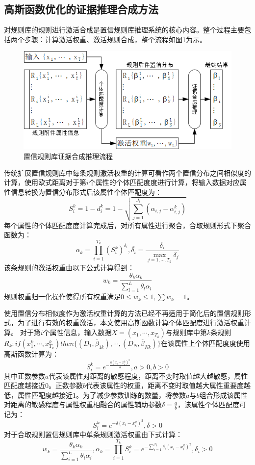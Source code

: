 \documentclass{cjc}
\begin{document}
\subsection{高斯函数优化的证据推理合成方法}
对规则库的规则进行激活合成是置信规则库推理系统的核心内容。整个过程主要包括两个步骤：计算激活权重、激活规则合成，整个流程如图1为示。
\begin{figure}
	\includegraphics[width=\linewidth]{1brb.png}
	\caption{置信规则库证据合成推理流程}
\end{figure}

传统扩展置信规则库中每条规则激活权重的计算可看作两个置信分布之间相似度的计算，使用欧式距离对于第$i$个属性的个体匹配度度进行计算，将输入数据对应属性信息转换为置信分布形式后该属性个体匹配度为：
$$S_i^k=1-d_i^k=1-\sqrt{\sum_{j=1}^{J_i}(\alpha_{i,j}-\alpha_{i,j}^k)}$$
每个属性的个体匹配度度计算完成后，对所有属性进行聚合，合取规则形式下聚合函数为：
$$\alpha_k=\prod_{i=1}^{T_k}(S_i^k)^{\overline{\delta_i}},\overline{\delta_i}=\frac{\delta_i}{\max_{j=1,\cdots,T_k}\delta_j}$$
该条规则的激活权重由以下公式计算得到：
$$w_k=\frac{\theta_k\alpha_k}{\sum_{l=1}^L\theta_l\alpha_l}$$
规则权重归一化操作使得所有权重满足$0\leq w_k\leq 1,\sum w_k=1$。

使用置信分布相似度作为激活权重计算的方法已经不再适用于简化后的置信规则形式，为了进行有效的权重激活，本文使用高斯函数计算个体匹配度进行激活权重计算。
对于第$i$个属性信息，输入数据$X=(x_1,\cdots,x_{T_k})$与规则库中第$k$条规则$R_k:if(x_1^k , \cdots , x_{T_k}^k)then\{(D_1,\overline{\beta}_{1k}),\cdots,(D_N,\overline{\beta}_{Nk})\}$在该属性上个体匹配度度使用高斯函数计算为：
$$S_i^k=e^{-\frac{a(x_i-x_i^k)^2}{b}},a>0,b>0$$
其中正数参数$a$代表该属性对距离的敏感程度，距离不变时取值越大越敏感，属性匹配度越接近0。正数参数$b$代表该属性的权重，距离不变时取值越大属性重要度越低，属性匹配度越接近1。为了减少参数训练的数量，将参数$a$与$b$组合形成该属性对距离的敏感程度与属性权重相融合的属性辅助参数$\delta=\frac{a}{b}$，该属性个体匹配度可记为：
$$S_i^k=e^{-\delta(x_i-x_i^k)^2},\delta>0$$
对于合取规则置信规则库中单条规则激活权重由下式计算：
$$w_k=\frac{\theta_k\alpha_k}{\sum_{i=1}^L\theta_i\alpha_i},\alpha_k=\prod_{i=1}^{T_k}S_i^k=e^{-\sum_{i=1}^{T_k}\delta_i(x_i-x_i^k)^2},\delta_i>0$$
\end{document}
